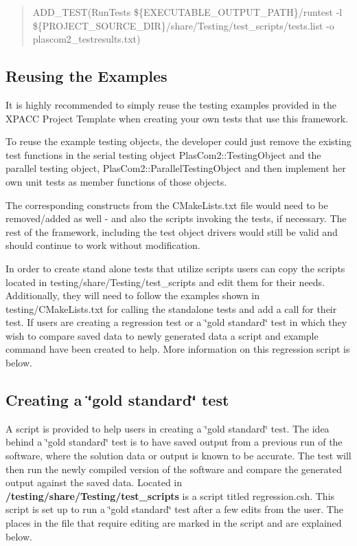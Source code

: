 \begin{quote}
A\+D\+D\+\_\+\+T\+E\+ST(Run\+Tests \$\{E\+X\+E\+C\+U\+T\+A\+B\+L\+E\+\_\+\+O\+U\+T\+P\+U\+T\+\_\+\+P\+A\+TH\}/runtest -\/l \$\{P\+R\+O\+J\+E\+C\+T\+\_\+\+S\+O\+U\+R\+C\+E\+\_\+\+D\+IR\}/share/\+Testing/test\+\_\+scripts/tests.list -\/o plascom2\+\_\+testresults.\+txt) \end{quote}
\hypertarget{testingproject_guide_direct_use}{}\subsection{Reusing the Examples}\label{testingproject_guide_direct_use}
It is highly recommended to simply reuse the testing examples provided in the X\+P\+A\+CC Project Template when creating your own tests that use this framework.

To reuse the example testing objects, the developer could just remove the existing test functions in the serial testing object Plas\+Com2\+::\+Testing\+Object and the parallel testing object, Plas\+Com2\+::\+Parallel\+Testing\+Object and then implement her own unit tests as member functions of those objects.

The corresponding constructs from the {\ttfamily C\+Make\+Lists.\+txt} file would need to be removed/added as well -\/ and also the scripts invoking the tests, if necessary. The rest of the framework, including the test object drivers would still be valid and should continue to work without modification.

In order to create stand alone tests that utilize scripts users can copy the scripts located in testing/share/\+Testing/test\+\_\+scripts and edit them for their needs. Additionally, they will need to follow the examples shown in testing/\+C\+Make\+Lists.\+txt for calling the standalone tests and add a call for their test. If users are creating a regression test or a \char`\"{}gold standard\char`\"{} test in which they wish to compare saved data to newly generated data a script and example command have been created to help. More information on this regression script is below.\hypertarget{testingproject_guide_gold_standard}{}\subsection{Creating a \char`\"{}gold standard\char`\"{} test}\label{testingproject_guide_gold_standard}
A script is provided to help users in creating a \char`\"{}gold standard\char`\"{} test. The idea behind a \char`\"{}gold standard\char`\"{} test is to have saved output from a previous run of the software, where the solution data or output is known to be accurate. The test will then run the newly compiled version of the software and compare the generated output against the saved data. Located in {\bfseries /testing/share/\+Testing/test\+\_\+scripts} is a script titled regression.\+csh. This script is set up to run a \char`\"{}gold standard\char`\"{} test after a few edits from the user. The places in the file that require editing are marked in the script and are explained below.

